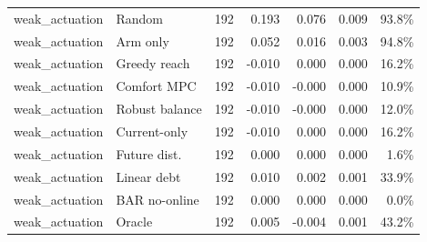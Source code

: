 \begin{longtable}{llrrrrr}
weak\_actuation & Random & 192 & 0.193 & 0.076 & 0.009 & 93.8\% \\
weak\_actuation & Arm only & 192 & 0.052 & 0.016 & 0.003 & 94.8\% \\
weak\_actuation & Greedy reach & 192 & -0.010 & 0.000 & 0.000 & 16.2\% \\
weak\_actuation & Comfort MPC & 192 & -0.010 & -0.000 & 0.000 & 10.9\% \\
weak\_actuation & Robust balance & 192 & -0.010 & -0.000 & 0.000 & 12.0\% \\
weak\_actuation & Current-only & 192 & -0.010 & 0.000 & 0.000 & 16.2\% \\
weak\_actuation & Future dist. & 192 & 0.000 & 0.000 & 0.000 & 1.6\% \\
weak\_actuation & Linear debt & 192 & 0.010 & 0.002 & 0.001 & 33.9\% \\
weak\_actuation & BAR no-online & 192 & 0.000 & 0.000 & 0.000 & 0.0\% \\
weak\_actuation & Oracle & 192 & 0.005 & -0.004 & 0.001 & 43.2\% \\
\bottomrule
\end{longtable}
